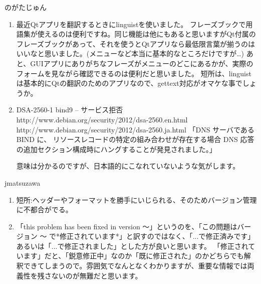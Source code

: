 \documentclass[mingoth,a4paper]{jsarticle}
\begin{document}
\begin{prework}{ のがたじゅん }

\begin{enumerate}
\item 最近Qtアプリを翻訳するときにlinguistを使いました。
フレーズブックで用語集が使えるのは便利ですね。同じ機能は他にもあると思いますがQt付属のフレーズブックがあって、それを使うとQtアプリなら最低限言葉が揃うのはいいなと思いました。(メニューなど本当に基本的なところだけですが…)
あと、GUIアプリにありがちなフレーズがメニューのどこにあるかが、実際のフォームを見ながら確認できるのは便利だと思いました。
短所は、linguistは基本的にQtの翻訳のためのアプリなので、gettext対応がオマケな事でしょうか。

\item DSA-2560-1 bind9 -- サービス拒否
http://www.debian.org/security/2012/dsa-2560.en.html
http://www.debian.org/security/2012/dsa-2560.ja.html
「DNS サーバである BIND に、 リソースレコードの特定の組み合わせが存在する場合 DNS 応答の追加セクション構成時にハングすることが発見されました。」

意味は分かるのですが、日本語的にこなれていないような気がします。
\end{enumerate}

\end{prework}

\begin{prework}{ jmatsuzawa }

\begin{enumerate}
\item 短所:ヘッダーやフォーマットを勝手にいじられる、そのためバージョン管理に不都合がでる。

\item
「this problem has been fixed in version 〜」というのを、「この問題はバージョン 〜 で*修正されています*」と訳すのではなく、「...で修正済みです」あるいは「...で修正されました」とした方が良いと思います。
「修正されています」だと、「鋭意修正中」なのか「既に修正された」のかどちらでも解釈できてしまうので。雰囲気でなんとなくわかりますが、重要な情報では両義性を残さないのが無難だと思います。
\end{enumerate}

\end{prework}
\end{document}
